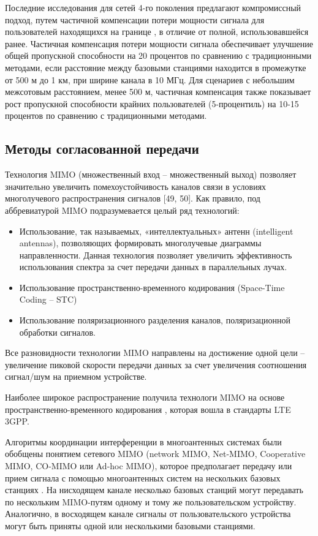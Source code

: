 Последние исследования для сетей 4-го поколения предлагают компромиссный подход, путем частичной компенсации потери мощности сигнала для пользователей находящихся на границе \cite{castellanos2008performance}, в отличие от полной, использовавшейся ранее. Частичная компенсация потери мощности сигнала обеспечивает улучшение общей пропускной способности на 20 процентов по сравнению с традиционными методами, если расстояние между базовыми станциями находится в промежутке от 500 м до 1 км, при ширине канала в 10 МГц. Для сценариев с небольшим межсотовым расстоянием, менее 500 м, частичная компенсация также показывает рост пропускной способности крайних пользователей (5-процентиль) на 10-15 процентов по сравнению с традиционными методами.

\subsection{Методы согласованной передачи} \label{sect4_2}
Технология MIMO (множественный вход – множественный выход) позволяет значительно увеличить помехоустойчивость каналов связи в условиях многолучевого распространения сигналов [49, 50]. Как правило, под аббревиатурой MIMO подразумевается целый ряд технологий:
\begin{itemize}
\item Использование, так называемых, «интеллектуальных» антенн (intelligent antennas), позволяющих формировать многолучевые диаграммы направленности. Данная технология позволяет увеличить эффективность использования спектра за счет передачи данных в параллельных лучах.
\item Использование пространственно-временного кодирования (Space-Time Coding – STC)
\item Использование поляризационного разделения каналов, поляризационной обработки сигналов.
\end{itemize}

Все разновидности технологии MIMO направлены на достижение одной цели – увеличение пиковой скорости передачи данных за счет увеличения соотношения сигнал/шум на приемном устройстве.

Наиболее широкое распространение получила технологи MIMO на основе пространственно-временного кодирования \cite{oestges2010mimo,3GPPTS2530,3GPPTR25814}, которая вошла в стандарты LTE 3GPP.

Алгоритмы координации интерференции в многоантенных системах были обобщены понятием сетевого MIMO (network MIMO, Net-MIMO, Cooperative MIMO, CO-MIMO или Ad-hoc MIMO), которое предполагает передачу или прием сигнала с помощью многоантенных систем на нескольких базовых станциях \cite{jindal2006mimo}. На нисходящем канале несколько базовых станций могут передавать по нескольким MIMO-путям одному и тому же пользовательском устройству. Аналогично, в восходящем канале сигналы от пользовательского устройства могут быть приняты одной или несколькими базовыми станциями.

